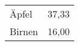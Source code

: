 \documentclass{article}
\begin{document}
  \begin{tabular}{|ll|}
      \hline
      Äpfel & 37,33 \\
      Birnen & 16,00 \\
      \hline
  \end{tabular}
\end{document}
